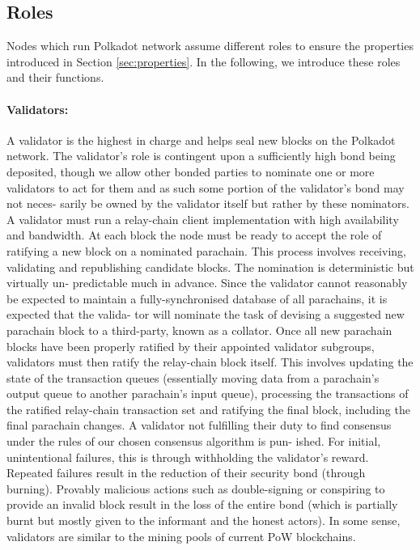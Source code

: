 \subsection{Roles}
Nodes which run Polkadot network assume different roles to ensure the properties introduced in Section \ref{sec:properties}. In the following, we introduce these roles and their functions.

  
\paragraph{Validators:} \label{par:validators} A validator is the highest in charge and helps seal new blocks on the Polkadot network. The validator’s role is contingent upon a sufficiently high bond being deposited, though we allow other bonded parties to nominate one or more validators to act for them and as such some portion of the validator’s bond may not neces- sarily be owned by the validator itself but rather by these nominators.
A validator must run a relay-chain client implementation with high availability and bandwidth. At each block the node must be ready to accept the role of ratifying a new block on a nominated parachain. This process involves receiving, validating and republishing candidate blocks. The nomination is deterministic but virtually un- predictable much in advance. Since the validator cannot reasonably be expected to maintain a fully-synchronised database of all parachains, it is expected that the valida- tor will nominate the task of devising a suggested new parachain block to a third-party, known as a collator.
Once all new parachain blocks have been properly ratified by their appointed validator subgroups, validators must then ratify the relay-chain block itself. This involves updating the state of the transaction queues (essentially moving data from a parachain’s output queue to another parachain’s input queue), processing the transactions of the ratified relay-chain transaction set and ratifying the final block, including the final parachain changes. A validator not fulfilling their duty to find consensus under the rules of our chosen consensus algorithm is pun- ished. For initial, unintentional failures, this is through withholding the validator’s reward. Repeated failures result in the reduction of their security bond (through burning). Provably malicious actions such as double-signing or conspiring to provide an invalid block result in the loss of the entire bond (which is partially burnt but mostly given to the informant and the honest actors).
In some sense, validators are similar to the mining pools of current PoW blockchains.

